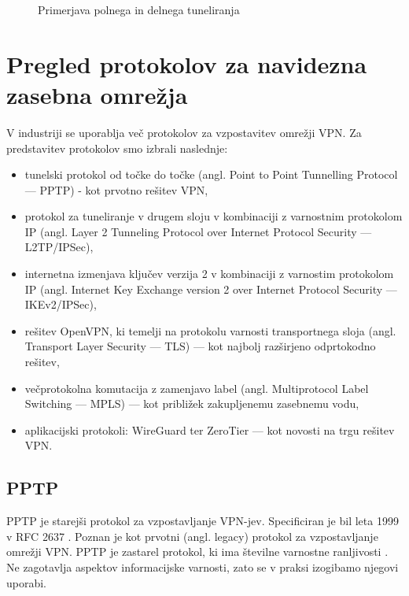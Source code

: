 \documentclass[a4paper, 12pt]{book}
\begin{document}
\begin{figure}[h]
\begin{center}

\end{center}
\caption{Primerjava polnega in delnega tuneliranja \cite{rvidmar}}%
\label{polno_delno}
\end{figure}


\section{Pregled protokolov za navidezna zasebna omrežja}
V industriji se uporablja več protokolov za vzpostavitev omrežji VPN. Za predstavitev protokolov smo izbrali naslednje:
\begin{itemize}
    \setlength\itemsep{0em}
    \item tunelski protokol od točke do točke (angl. Point to Point Tunnelling Protocol --- PPTP) - kot prvotno rešitev VPN,
    
    \item protokol za tuneliranje v drugem sloju v kombinaciji z varnostnim protokolom IP (angl. Layer 2 Tunneling Protocol over Internet Protocol Security --- L2TP/IPSec),
    
    \item internetna izmenjava ključev verzija 2 v kombinaciji z varnostim protokolom IP (angl. Internet Key Exchange version 2 over Internet Protocol Security --- IKEv2/IPSec),
    
    \item rešitev OpenVPN, ki temelji na protokolu varnosti transportnega sloja (angl. Transport Layer Security --- TLS) --- kot najbolj razširjeno odprtokodno rešitev,
    
    \item večprotokolna komutacija z zamenjavo label (angl. Multiprotocol Label Switching --- MPLS) --- kot približek zakupljenemu zasebnemu vodu,
    
    \item aplikacijski protokoli: WireGuard ter ZeroTier --- kot novosti na trgu rešitev VPN.
    
\end{itemize}


\subsection{PPTP}
\label{pptp}
PPTP je starejši protokol za vzpostavljanje VPN-jev. Specificiran je bil leta 1999 v RFC 2637 \cite{zorn_point--point_1999}. Poznan je kot prvotni (angl. legacy) protokol za vzpostavljanje omrežji VPN.
PPTP je zastarel protokol, ki ima številne varnostne ranljivosti \cite{schneier_cryptanalysis_nodate}. Ne zagotavlja aspektov informacijske varnosti, zato se v praksi izogibamo njegovi uporabi.
\end{document}
